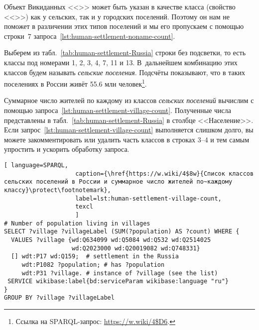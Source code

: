 Объект Викиданных <<>> 
может быть указан в качестве класса (свойство <<>>) 
как у сельских, так и у городских поселений. 
Поэтому он нам не поможет в различении этих типов поселений 
и мы его пропускаем с помощью строки~7 запроса~\ref{lst:human-settlement-noname-count}.



\newpage
Выберем из табл.~\ref{tab:human-settlement-Russia} строки без подсветки, 
то есть классы под номерами 1, 2, 3, 4, 7, 11 и 13. 
В~дальнейшем комбинацию этих классов будем называть \emph{сельские поселения}. 
Подсчёты показывают, что в таких поселениях в России живёт 
\num{55,6} млн человек\footnote{%
Ссылка на SPARQL-запрос: \url{https://w.wiki/4$D6}.%
}. 

Суммарное число жителей по каждому из классов \emph{сельских поселений} 
вычислим с помощью запроса~\ref{lst:human-settlement-village-count}. 
Полученные числа представлены в табл.~\ref{tab:human-settlement-Russia} в столбце <<Население>>. 
Если запрос~\ref{lst:human-settlement-village-count} выполняется слишком долго, 
вы можете закомментировать или удалить часть классов в строках 3--4 
и тем самым упростить и ускорить обработку запроса. 

\begin{lstlisting}[ language=SPARQL, 
                    caption={\href{https://w.wiki/4$8w}{Список классов сельских поселений в России и суммарное число жителей по~каждому классу}\protect\footnotemark},
                    label=lst:human-settlement-village-count,
                    texcl 
                    ]
# Number of population living in villages
SELECT ?village ?villageLabel (SUM(?population) AS ?count) WHERE {  
  VALUES ?village {wd:Q634099 wd:Q5084 wd:Q532 wd:Q2514025 
                   wd:Q2023000 wd:Q20019082 wd:Q748331}
  [] wdt:P17 wd:Q159;  # settlement in the Russia
     wdt:P1082 ?population; # has ?population
     wdt:P31 ?village. # instance of ?village (see the list)
 SERVICE wikibase:label{bd:serviceParam wikibase:language "ru"}
}
GROUP BY ?village ?villageLabel
\end{lstlisting}%



